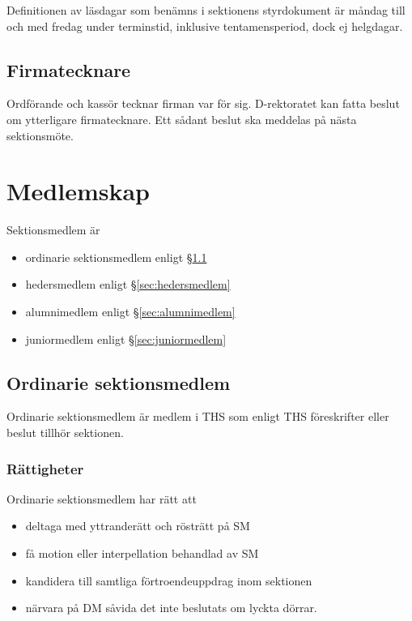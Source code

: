 \documentclass{dgovdoc}
\begin{document}
Definitionen av läsdagar som benämns i sektionens styrdokument är
måndag till och med fredag under terminstid, inklusive tentamensperiod, dock ej helgdagar.

\subsection{Firmatecknare}

Ordförande och kassör tecknar firman var för sig. D-rektoratet kan fatta beslut
om ytterligare firmatecknare. Ett sådant beslut ska meddelas på nästa
sektionsmöte.

\section{Medlemskap}

Sektionsmedlem är

\begin{itemize}
  \item ordinarie sektionsmedlem enligt \S\ref{sec:ordinarie_sektionsmedlem}
  \item hedersmedlem enligt \S\ref{sec:hedersmedlem}
  \item alumnimedlem enligt \S\ref{sec:alumnimedlem}
  \item juniormedlem enligt \S\ref{sec:juniormedlem}
\end{itemize}

\subsection{Ordinarie sektionsmedlem}
\label{sec:ordinarie_sektionsmedlem}

Ordinarie sektionsmedlem är medlem i THS som enligt THS föreskrifter eller
beslut tillhör sektionen.

\subsubsection{Rättigheter}

Ordinarie sektionsmedlem har rätt att

\begin{itemize}
  \item deltaga med yttranderätt och rösträtt på SM
  \item få motion eller interpellation behandlad av SM
  \item kandidera till samtliga förtroendeuppdrag inom sektionen
  \item närvara på DM såvida det inte beslutats om lyckta dörrar.
\end{itemize}
\end{document}
